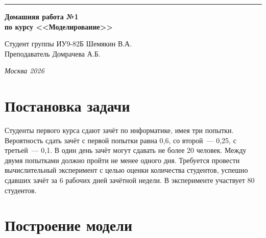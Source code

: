 \documentclass[a4paper, 14pt]{extarticle}
\begin{document}
\begin{titlepage}
\vspace*{-16pt}
\hspace{30pt}\rule{0.866\textwidth}{0.4pt}
  
\vspace{11em}

\begin{center}
\Large {\bf Домашняя работа №1} \\ 
\large {\bf по курсу <<Моделирование>>} \\
\end{center}\normalsize

\vspace{8em}


\begin{flushright}
  {Студент группы ИУ9-82Б Шемякин В.А. \hspace*{15pt}\\ 
  \vspace{2ex}
  Преподаватель Домрачева А.Б.\hspace*{15pt}}
\end{flushright}

\bigskip

\vfill
 

\begin{center}
\textsl{Москва 2026}
\end{center}
\end{titlepage}

\renewcommand{\ttdefault}{pcr}

\setlength{\tabcolsep}{3pt}
\newpage
\setcounter{page}{2}
\section{Постановка задачи}

Студенты первого курса сдают зачёт по информатике, имея три попытки. Вероятность сдать зачёт с первой попытки равна 0,6, со второй~--- 0,25, с третьей~--- 0,1. В один день зачёт могут сдавать не более 20 человек. Между двумя попытками должно пройти не менее одного дня. Требуется провести вычислительный эксперимент с целью оценки количества студентов, успешно сдавших зачёт за 6 рабочих дней зачётной недели. В эксперименте участвует 80 студентов.

\section{Построение модели}
\end{document}
